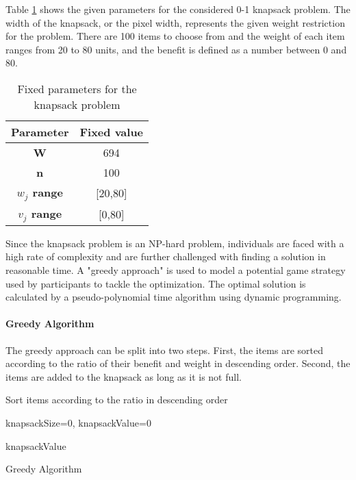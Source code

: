 Table \ref{tab:KnapsackParamters} shows the given parameters for the considered 0-1 knapsack problem. The width of the knapsack, or the pixel width, represents the given weight restriction for the problem. There are 100 items to choose from and the weight of each item ranges from 20 to 80 units, and the benefit is defined as a number between 0 and 80.
\begin{table}[h] %
  \centering
    \begin{tabular}{c|c}
    \textbf{Parameter} & \multicolumn{1}{c}{\textbf{Fixed value}} \bigstrut[b]\\
    \hline
    \textbf{W} & 694 \bigstrut\\
    \hline
    \textbf{n} & 100 \bigstrut\\
    \hline
    \textbf{$w_j$ range} & \multicolumn{1}{c}{[20,80]} \bigstrut\\
    \hline
    \textbf{$v_j$ range} & \multicolumn{1}{c}{[0,80]} \bigstrut\\
    \hline
    \end{tabular}%
  \caption{Fixed parameters for the knapsack problem}
    \label{tab:KnapsackParamters}
\end{table}%
\newpage
Since the knapsack problem is an NP-hard problem, individuals are faced with a high rate of complexity and are further challenged with finding a solution in reasonable time. A "greedy approach" is used to model a potential game strategy used by participants to tackle the optimization.
The optimal solution is calculated by a pseudo-polynomial time algorithm using dynamic programming.


\paragraph{Greedy Algorithm}
The greedy approach can be split into two steps. First, the items are sorted according to the ratio of their benefit and weight in descending order. Second, the items are added to the knapsack as long as it is not full.\\

\begin{algorithm} %
\LinesNumbered
\setcounter{AlgoLine}{0}
\SetNoFillComment
 \SetAlgoLined
Sort items according to the ratio in descending order\;

knapsackSize=0, knapsackValue=0\;

\Return knapsackValue\;

\caption{Greedy Algorithm}
\end{algorithm}

